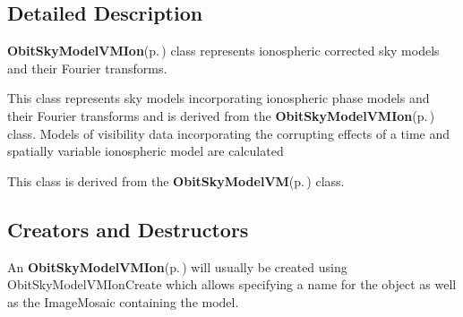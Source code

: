 \subsection{Detailed Description}
{\bf Obit\-Sky\-Model\-VMIon}{\rm (p.\,\pageref{structObitSkyModelVMIon})} class represents ionospheric corrected sky models and their Fourier transforms. 

This class represents sky models incorporating ionospheric phase models and their Fourier transforms and is derived from the {\bf Obit\-Sky\-Model\-VMIon}{\rm (p.\,\pageref{structObitSkyModelVMIon})} class. Models of visibility data incorporating the corrupting effects of a time and spatially variable ionospheric model are calculated

This class is derived from the {\bf Obit\-Sky\-Model\-VM}{\rm (p.\,\pageref{structObitSkyModelVM})} class.\subsection{Creators and Destructors}\label{ObitSkyModelVMIon_8h_ObitSkyModelVMIonaccess}
An {\bf Obit\-Sky\-Model\-VMIon}{\rm (p.\,\pageref{structObitSkyModelVMIon})} will usually be created using Obit\-Sky\-Model\-VMIon\-Create which allows specifying a name for the object as well as the Image\-Mosaic containing the model.

